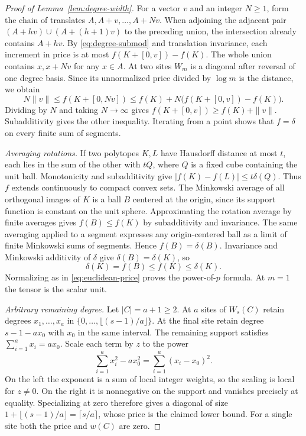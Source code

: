 \begin{proof}[Proof of Lemma~\ref{lem:degree-width}]
For a vector \(v\) and an integer \(N\ge1\), form the chain of
translates \(A,A+v,\ldots,A+Nv\). When adjoining the adjacent pair
\((A+hv)\cup(A+(h+1)v)\) to the preceding union, the intersection
already contains \(A+hv\). By \eqref{eq:degree-submod} and translation
invariance, each increment in price is at most \(f(K+[0,v])-f(K)\).
The whole union contains \(x,x+Nv\) for any \(x\in A\). At two sites
\(W_m\) is a diagonal after reversal of one degree basis. Since its
unnormalized price divided by \(\log m\) is the distance, we obtain
\[
 N\|v\|\le f(K+[0,Nv])
              \le f(K)+N\bigl(f(K+[0,v])-f(K)\bigr).
\]
Dividing by \(N\) and taking \(N\to\infty\) gives
\(f(K+[0,v])\ge f(K)+\|v\|\). Subadditivity gives the other inequality.
Iterating from a point shows that \(f=\delta\) on every finite sum
of segments.

\emph{Averaging rotations.}
If two polytopes \(K,L\) have Hausdorff distance at most \(t\), each
lies in the sum of the other with \(tQ\), where \(Q\) is a fixed cube
containing the unit ball. Monotonicity and subadditivity give
\(\lvert f(K)-f(L)\rvert\le t\delta(Q)\). Thus \(f\) extends
continuously to compact convex sets. The Minkowski average of all
orthogonal images of \(K\) is a ball \(B\) centered at the origin,
since its support function is constant on the unit sphere.
Approximating the rotation average by finite averages gives
\(f(B)\le f(K)\) by subadditivity and invariance. The same averaging
applied to a segment expresses any origin-centered ball as a limit of
finite Minkowski sums of segments. Hence \(f(B)=\delta(B)\).
Invariance and Minkowski additivity of \(\delta\) give
\(\delta(B)=\delta(K)\), so
\[
                   \delta(K)=f(B)\le f(K)\le\delta(K).
\]
Normalizing as in \eqref{eq:euclidean-price} proves the power-of-\(p\)
formula. At \(m=1\) the tensor is the scalar unit.

\emph{Arbitrary remaining degree.}
Let \(|C|=a+1\ge2\). At \(a\) sites of \(W_s(C)\) retain degrees
\(x_1,\ldots,x_a\) in \(\{0,\ldots,\lfloor(s-1)/a\rfloor\}\).
At the final site retain degree \(s-1-a x_0\) with \(x_0\) in the
same interval. The remaining support satisfies \(\sum_{i=1}^a x_i=a x_0\).
Scale each term by \(z\) to the power
\[
      \sum_{i=1}^a x_i^2-a x_0^2=\sum_{i=1}^a(x_i-x_0)^2 .
\]
On the left the exponent is a sum of local integer weights, so the
scaling is local for \(z\ne0\). On the right it is nonnegative on
the support and vanishes precisely at equality. Specializing at zero
therefore gives a diagonal of size \(1+\lfloor(s-1)/a\rfloor
=\lceil s/a\rceil\), whose price is the claimed lower bound. For a
single site both the price and \(w(C)\) are zero.
\end{proof}
